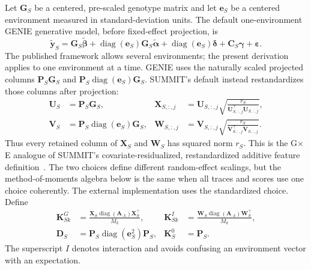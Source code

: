 \documentclass[11pt]{article}
\newcommand{\diag}{\operatorname{diag}}
\newcommand{\bP}{\bm P}
\newcommand{\bK}{\bm K}
\newcommand{\by}{\bm y}
\newcommand{\be}{\bm e}
\newcommand{\bX}{\bm X}
\newcommand{\bW}{\bm W}
\newcommand{\bC}{\bm C}
\newcommand{\bD}{\bm D}
\begin{document}
Let $\bm G_S$ be a centered, pre-scaled genotype matrix and let $\be_S$ be a
centered environment measured in standard-deviation units.  The default
one-environment GENIE generative model, before fixed-effect projection, is
\begin{equation}
 \widetilde{\by}_S=\bm G_S\widetilde{\bm\beta}
  +\diag(\be_S)\bm G_S\widetilde{\bm\alpha}
  +\diag(\be_S)\bm\delta+\bC_S\bm\gamma+\bm\varepsilon.
 \label{eq:rawmodel}
\end{equation}
The published framework allows several environments; the present derivation
applies to one environment at a time.  GENIE uses the naturally scaled
projected columns $\bP_S\bm G_S$ and
$\bP_S\diag(\be_S)\bm G_S$.  SUMMIT's default instead restandardizes those
columns after projection:
\begin{align}
 \bm U_S&=\bP_S\bm G_S,&
 \bX_{S,:,j}&=\bm U_{S,:,j}
       \sqrt{\frac{r_S}{\bm U_{S,:,j}^\top\bm U_{S,:,j}}},\nonumber\\
 \bm V_S&=\bP_S\diag(\be_S)\bm G_S,&
 \bW_{S,:,j}&=\bm V_{S,:,j}
       \sqrt{\frac{r_S}{\bm V_{S,:,j}^\top\bm V_{S,:,j}}}.
 \label{eq:features}
\end{align}
Thus every retained column of $\bX_S$ and $\bW_S$ has squared norm $r_S$.
This is the G$\times$E analogue of SUMMIT's covariate-residualized,
restandardized additive feature definition~\cite{summit}.  The two choices
define different random-effect scalings, but the method-of-moments algebra
below is the same when all traces and scores use one choice coherently.  The
external implementation uses the standardized choice.  Define
\begin{align}
 \bK^G_{Sk}&=\frac{\bX_S\diag(\bm A_{:k})\bX_S^\top}{M_k},&
 \bK^I_{Sk}&=\frac{\bW_S\diag(\bm A_{:k})\bW_S^\top}{M_k},\nonumber\\
 \bD_S&=\bP_S\diag(\be_S^2)\bP_S,&
 \bK^0_S&=\bP_S.
 \label{eq:kernels}
\end{align}
The superscript $I$ denotes interaction and avoids confusing an environment
vector with an expectation.
\end{document}

